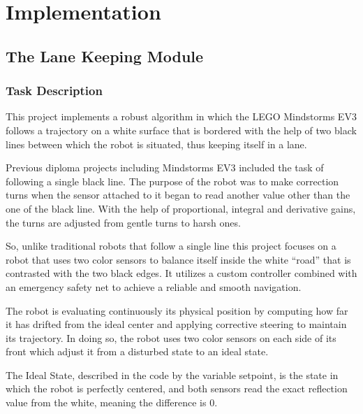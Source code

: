 \chapter{Implementation}
\label{ch:implementation}

\section{The Lane Keeping Module}
\label{sec:lane-keeping}

\subsection{Task Description}
\label{sec:lk-task}

This project implements a robust algorithm in which the LEGO Mindstorms EV3 follows a trajectory on a white surface that is bordered with the help of two black lines between which the robot is situated, thus keeping itself in a lane.

Previous diploma projects including Mindstorms EV3 included the task of following a single black line. The purpose of the robot was to make correction turns when the sensor attached to it began to read another value other than the one of the black line. With the help of proportional, integral and derivative gains, the turns are adjusted from gentle turns to harsh ones.

So, unlike traditional robots that follow a single line this project focuses on a robot that uses two color sensors to balance itself inside the white ``road'' that is contrasted with the two black edges. It utilizes a custom controller combined with an emergency safety net to achieve a reliable and smooth navigation.

The robot is evaluating continuously its physical position by computing how far it has drifted from the ideal center and applying corrective steering to maintain its trajectory. In doing so, the robot uses two color sensors on each side of its front which adjust it from a disturbed state to an ideal state.

The Ideal State, described in the code by the variable setpoint, is the state in which the robot is perfectly centered, and both sensors read the exact reflection value from the white, meaning the difference is 0.


